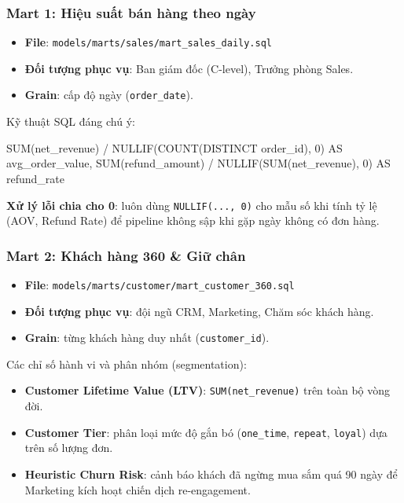 \documentclass[12pt]{article}
\begin{document}
\subsubsection{Mart 1: Hiệu suất bán hàng theo ngày}

\begin{itemize}
    \item \textbf{File}: \texttt{models/marts/sales/mart\_sales\_daily.sql}
    \item \textbf{Đối tượng phục vụ}: Ban giám đốc (C-level), Trưởng phòng Sales.
    \item \textbf{Grain}: cấp độ ngày (\texttt{order\_date}).
\end{itemize}

Kỹ thuật SQL đáng chú ý:

\begin{aivnsqlbox}
SUM(net_revenue) / NULLIF(COUNT(DISTINCT order_id), 0) AS avg_order_value,
SUM(refund_amount) / NULLIF(SUM(net_revenue), 0)       AS refund_rate
\end{aivnsqlbox}

\begin{notebox}
\textbf{Xử lý lỗi chia cho 0}: luôn dùng \texttt{NULLIF(..., 0)} cho mẫu số khi tính tỷ lệ (AOV, Refund Rate) để pipeline không sập khi gặp ngày không có đơn hàng.
\end{notebox}

\subsubsection{Mart 2: Khách hàng 360 \& Giữ chân}

\begin{itemize}
    \item \textbf{File}: \texttt{models/marts/customer/mart\_customer\_360.sql}
    \item \textbf{Đối tượng phục vụ}: đội ngũ CRM, Marketing, Chăm sóc khách hàng.
    \item \textbf{Grain}: từng khách hàng duy nhất (\texttt{customer\_id}).
\end{itemize}

Các chỉ số hành vi và phân nhóm (segmentation):
\begin{itemize}
    \item \textbf{Customer Lifetime Value (LTV)}: \texttt{SUM(net\_revenue)} trên toàn bộ vòng đời.
    \item \textbf{Customer Tier}: phân loại mức độ gắn bó (\texttt{one\_time}, \texttt{repeat}, \texttt{loyal}) dựa trên số lượng đơn.
    \item \textbf{Heuristic Churn Risk}: cảnh báo khách đã ngừng mua sắm quá 90 ngày để Marketing kích hoạt chiến dịch re-engagement.
\end{itemize}
\end{document}
